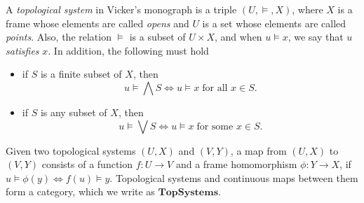 \documentclass[11pt]{article}
\begin{document}
A {\em topological system} in Vicker's monograph\cite{vickers90} is a triple
$(U,\models,X)$, where $X$ is a frame whose elements are called {\em opens} and 
$U$ is a set whose elements are called {\em points}. Also,  the relation  $\models$ 
is a subset of $U\times X$, and when $u\models x$, we say that $u$ {\em satisfies} 
$x$. In addition, the following must hold
\begin{itemize}
\item if $S$ is a finite subset of $X$, then
\begin{displaymath}
u\models \bigwedge S \Longleftrightarrow u\models x\;\text{for all $x\in S$}.
\end{displaymath}
\item if $S$ is any subset of $X$, then 
\begin{displaymath}
u\models\bigvee S \Longleftrightarrow u\models x\;\text{for some $x\in S$}.
\end{displaymath}
\end{itemize}

Given two topological systems $(U,X)$ and $(V,Y)$, a map from $(U,X)$ to $(V,Y)$ 
consists of a  function $f:U\rightarrow V$ and a frame homomorphism $\phi:Y\rightarrow X$,
if $u\models \phi(y) \Leftrightarrow f(u)\models y$. Topological systems and 
continuous maps between them form a category, which we write as $\mathbf{TopSystems}$.
\end{document}

